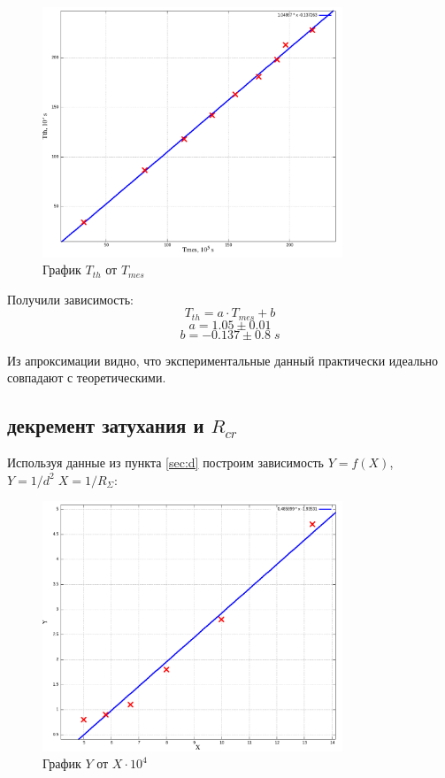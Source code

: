\documentclass{article}
\begin{document}
\begin{figure}[H]
    \centering
    \includegraphics[width=0.8\textwidth]{T-T-res.png}
    \caption{График \(T_{th}\) от \(T_{mes}\)}
    \label{fig:T-T}
\end{figure}

Получили зависимость:
\[ T_{th} = a\cdot T_{mes} + b\]
\[ a = 1.05 \pm 0.01 \]
\[ b = -0.137 \pm 0.8\; s \]

Из апроксимации видно, что экспериментальные данный практически идеально совпадают с теоретическими.
\subsection{декремент затухания и \(R_{cr}\)}
Используя данные из пункта \ref{sec:d} построим зависимость \( Y = f ( X ) \),
\(Y = 1/d^2\; X = 1/R_{\Sigma}\):
\begin{figure}[H]
    \centering
    \includegraphics[width=0.8\textwidth]{d.png}
    \caption{График \(Y\) от \(X\cdot 10^4\)}
    \label{fig:d}
\end{figure}
\end{document}
